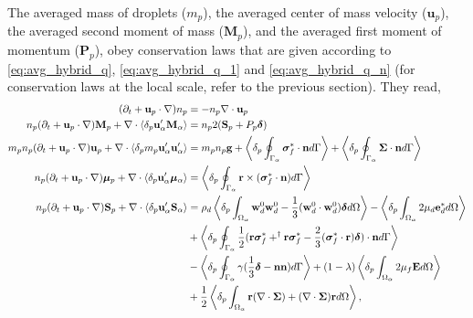 The averaged mass of droplets ($m_p$), the averaged center of mass velocity ($\textbf{u}_p$), the averaged second moment of mass ($\textbf{M}_p$), and the averaged first moment of momentum ($\textbf{P}_p$), 
obey conservation laws that are given according to \ref{eq:avg_hybrid_q}, \ref{eq:avg_hybrid_q_1} and \ref{eq:avg_hybrid_q_n} (for conservation laws at the local scale, refer to the previous section).
They read, 
\begin{align}
    (\pddt + \textbf{u}_p \cdot \grad)n_p
    &=
    - n_p \div \textbf{u}_p\label{eq:mass_p}\\
    n_p (\pddt + \textbf{u}_p \cdot \grad) \textbf{M}_p
    +\div  \pavg{\textbf{u}_\alpha'\textbf{M}_\alpha}
    &=
    n_p2  (\textbf{S}_p+P_p\bm\delta)
    \label{eq:dt_hybrid_Mp}\\
    \label{eq:dt_hybrid_up}
    m_p n_p(\pddt + \textbf{u}_p \cdot \grad)\textbf{u}_p
    + \div \pavg{m_p \textbf{u}_\alpha'\textbf{u}_\alpha'}
    &=
    m_p n_p \textbf{g}
    + \pSavg{\bm\sigma_f^* \cdot \textbf{n}} + \pSavg{\bm\Sigma \cdot \textbf{n}}\\
    \label{eq:dt_hybrid_mup}
    n_p (\pddt + \textbf{u}_p \cdot \grad) \bm{\mu}_p
    +\div  \pavg{\textbf{u}_\alpha'\bm\mu_\alpha}
    &=
    \pSavg{\textbf{r}\times(\bm\sigma_f^*\cdot \textbf{n})}
    \\
    n_p (\pddt + \textbf{u}_p \cdot \grad) \textbf{S}_p
    +\div  \pavg{\textbf{u}_\alpha'\textbf{S}_\alpha}
    &=
    \rho_d \pOavg{
        \textbf{w}_d^0  \textbf{w}_d^0 
        -\frac{1}{3} (\textbf{w}_d^0 \cdot  \textbf{w}_d^0) \bm\delta
    }
    - \pOavg{2 \mu_d\textbf{e}_d^*} \nonumber \\
    &+\pSavg{\frac{1}{2}(\textbf{r}\bm\sigma_f^*+^\dagger\textbf{r}\bm\sigma_f^*-\frac{2}{3}(\bm\sigma_f^* \cdot \textbf{r})\bm\delta)\cdot \textbf{n}}\nonumber\\
    &-  \pSavg{\gamma (\frac{1}{3}\bm\delta - \textbf{nn})}
     + (1-\lambda)\pOavg{2\mu_f\textbf{E}}\nonumber \\
     &+ \frac{1}{2}\pOavg{\textbf{r}(\div\bm\Sigma)+ (\div\bm\Sigma) \textbf{r}},
    \label{eq:dt_hybrid_Sp}
\end{align}
